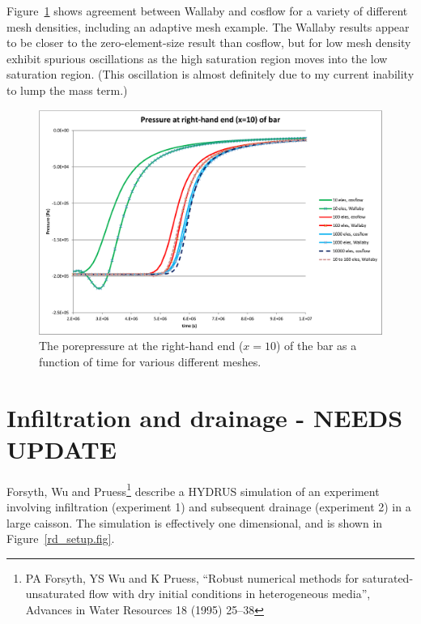 \documentclass[]{scrreprt}
\begin{document}
Figure~\ref{uf.result.fig} shows agreement between Wallaby and
cosflow for a variety of different mesh densities, including an
adaptive mesh example.  The Wallaby results appear to be closer to the
zero-element-size result than cosflow, but for low mesh density
exhibit spurious oscillations as the high saturation region moves into
the low saturation region.  (This oscillation is almost definitely due
to my current inability to lump the mass term.)

\begin{figure}[htb]
\begin{center}
\includegraphics[width=17cm]{uf.eps}
\caption{The porepressure at the right-hand end ($x=10$) of the bar as
  a function of time for various different meshes.}
\label{uf.result.fig}
\end{center}
\end{figure}


\chapter{Infiltration and drainage - NEEDS UPDATE}

Forsyth, Wu and Pruess\footnote{PA Forsyth, YS Wu and K Pruess,
  ``Robust numerical methods for saturated-unsaturated flow with dry
  initial conditions in heterogeneous media'', Advances in Water
  Resources 18 (1995) 25--38} describe a HYDRUS simulation of an
experiment involving infiltration (experiment 1) and subsequent
drainage (experiment 2) in a large caisson.  The simulation is
effectively one dimensional, and is shown in
Figure~\ref{rd_setup.fig}.
\end{document}
